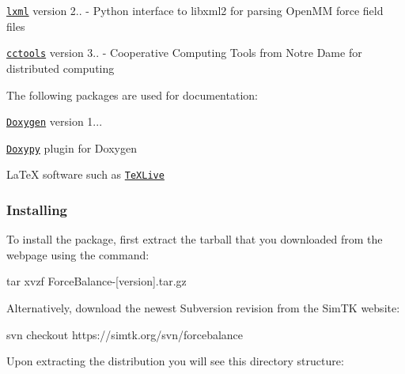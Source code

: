 \begin{DoxyItemize}
\item \href{http://lxml.de/}{\tt lxml} version 2.. -\/ Python interface to libxml2 for parsing Open\-M\-M force field files \item \href{http://nd.edu/~ccl/software/}{\tt cctools} version 3.. -\/ Cooperative Computing Tools from Notre Dame for distributed computing\end{DoxyItemize}
The following packages are used for documentation\-:

\begin{DoxyItemize}
\item \href{http://www.stack.nl/~dimitri/doxygen/}{\tt Doxygen} version 1... \item \href{http://code.foosel.org/doxypy}{\tt Doxypy} plugin for Doxygen \item La\-Te\-X software such as \href{http://www.tug.org/texlive/}{\tt Te\-X\-Live}\end{DoxyItemize}
\hypertarget{installation_installing_forcebalance_install}{}\subsubsection{Installing}\label{installation_installing_forcebalance_install}
To install the package, first extract the tarball that you downloaded from the webpage using the command\-:

\begin{DoxyVerb}tar xvzf ForceBalance-[version].tar.gz \end{DoxyVerb}


Alternatively, download the newest Subversion revision from the Sim\-T\-K website\-:

\begin{DoxyVerb}svn checkout https://simtk.org/svn/forcebalance \end{DoxyVerb}


Upon extracting the distribution you will see this directory structure\-:

